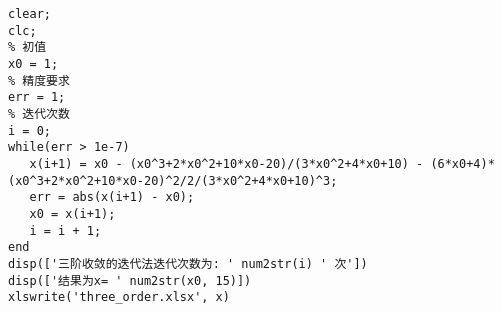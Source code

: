\documentclass[a4paper]{article}
\begin{document}
\begin{CJK*}{GBK}{song}
\begin{enumerate}[(1)]
\begin{lstlisting}
clear;
clc;
% 初值
x0 = 1;
% 精度要求
err = 1;
% 迭代次数
i = 0;
while(err > 1e-7)
   x(i+1) = x0 - (x0^3+2*x0^2+10*x0-20)/(3*x0^2+4*x0+10) - (6*x0+4)*(x0^3+2*x0^2+10*x0-20)^2/2/(3*x0^2+4*x0+10)^3;
   err = abs(x(i+1) - x0);
   x0 = x(i+1);
   i = i + 1;
end
disp(['三阶收敛的迭代法迭代次数为: ' num2str(i) ' 次'])
disp(['结果为x= ' num2str(x0, 15)])
xlswrite('three_order.xlsx', x)
\end{lstlisting}
\end{enumerate}




\end{CJK*}
\end{document}
